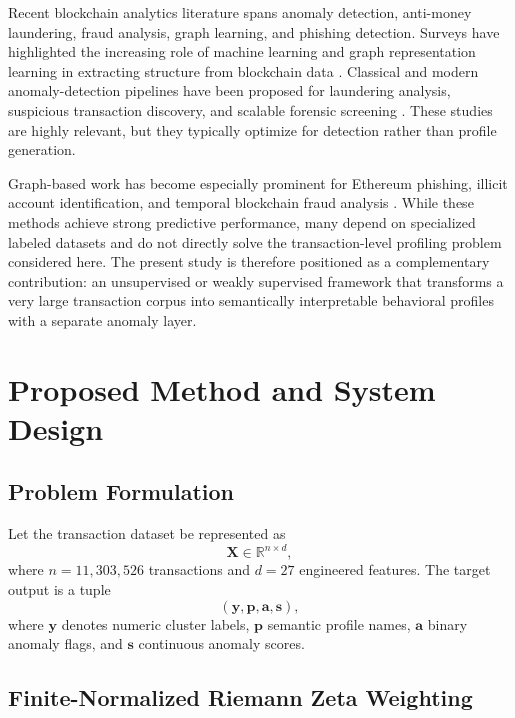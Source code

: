\documentclass{ieeeaccess}
\begin{document}
Recent blockchain analytics literature spans anomaly detection, anti-money laundering, fraud analysis, graph learning, and phishing detection. Surveys have highlighted the increasing role of machine learning and graph representation learning in extracting structure from blockchain data \cite{ref1,ref2,ref3}. Classical and modern anomaly-detection pipelines have been proposed for laundering analysis, suspicious transaction discovery, and scalable forensic screening \cite{ref4,ref5,ref6,ref7,ref21,ref30}. These studies are highly relevant, but they typically optimize for detection rather than profile generation.

Graph-based work has become especially prominent for Ethereum phishing, illicit account identification, and temporal blockchain fraud analysis \cite{ref9,ref10,ref11,ref12,ref13,ref18,ref19,ref20,ref24,ref25,ref26,ref27,ref28,ref29,ref31,ref32,ref33,ref34,ref35}. While these methods achieve strong predictive performance, many depend on specialized labeled datasets and do not directly solve the transaction-level profiling problem considered here. The present study is therefore positioned as a complementary contribution: an unsupervised or weakly supervised framework that transforms a very large transaction corpus into semantically interpretable behavioral profiles with a separate anomaly layer.

\section{Proposed Method and System Design}

\subsection{Problem Formulation}

Let the transaction dataset be represented as
\begin{equation}
\mathbf{X} \in \mathbb{R}^{n \times d},
\end{equation}
where $n = 11{,}303{,}526$ transactions and $d = 27$ engineered features. The target output is a tuple
\begin{equation}
(\mathbf{y}, \mathbf{p}, \mathbf{a}, \mathbf{s}),
\end{equation}
where $\mathbf{y}$ denotes numeric cluster labels, $\mathbf{p}$ semantic profile names, $\mathbf{a}$ binary anomaly flags, and $\mathbf{s}$ continuous anomaly scores.

\subsection{Finite-Normalized Riemann Zeta Weighting}
\end{document}
